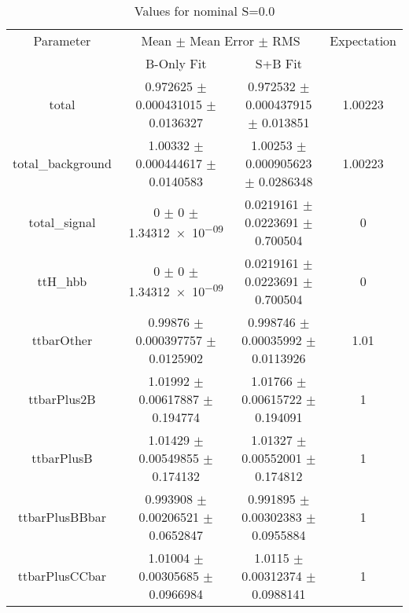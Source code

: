\begin{table}
\centering
\caption{Values for nominal S=0.0}
\begin{tabular}{cccc}
\toprule
Parameter & \multicolumn{2}{c}{Mean $\pm$ Mean Error $\pm$ RMS} & Expectation\\
 & B-Only Fit & S+B Fit & \\
\midrule
total & \num{0.972625} $\pm$ \num{0.000431015} $\pm$ \num{0.0136327} & \num{0.972532} $\pm$ \num{0.000437915} $\pm$ \num{0.013851} & \num{1.00223}\\
total\_background & \num{1.00332} $\pm$ \num{0.000444617} $\pm$ \num{0.0140583} & \num{1.00253} $\pm$ \num{0.000905623} $\pm$ \num{0.0286348} & \num{1.00223}\\
total\_signal & \num{0} $\pm$ \num{0} $\pm$ \num{1.34312e-09} & \num{0.0219161} $\pm$ \num{0.0223691} $\pm$ \num{0.700504} & \num{0}\\
ttH\_hbb & \num{0} $\pm$ \num{0} $\pm$ \num{1.34312e-09} & \num{0.0219161} $\pm$ \num{0.0223691} $\pm$ \num{0.700504} & \num{0}\\
ttbarOther & \num{0.99876} $\pm$ \num{0.000397757} $\pm$ \num{0.0125902} & \num{0.998746} $\pm$ \num{0.00035992} $\pm$ \num{0.0113926} & \num{1.01}\\
ttbarPlus2B & \num{1.01992} $\pm$ \num{0.00617887} $\pm$ \num{0.194774} & \num{1.01766} $\pm$ \num{0.00615722} $\pm$ \num{0.194091} & \num{1}\\
ttbarPlusB & \num{1.01429} $\pm$ \num{0.00549855} $\pm$ \num{0.174132} & \num{1.01327} $\pm$ \num{0.00552001} $\pm$ \num{0.174812} & \num{1}\\
ttbarPlusBBbar & \num{0.993908} $\pm$ \num{0.00206521} $\pm$ \num{0.0652847} & \num{0.991895} $\pm$ \num{0.00302383} $\pm$ \num{0.0955884} & \num{1}\\
ttbarPlusCCbar & \num{1.01004} $\pm$ \num{0.00305685} $\pm$ \num{0.0966984} & \num{1.0115} $\pm$ \num{0.00312374} $\pm$ \num{0.0988141} & \num{1}\\
\bottomrule
\end{tabular}
\end{table}